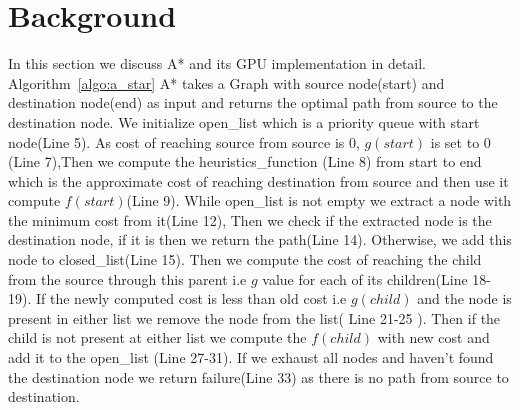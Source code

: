 \documentclass[a4paper]{article}
\begin{document}

\section{Background}\label{sec:background}
In this section we discuss A* and its GPU implementation in detail.
Algorithm~\ref{algo:a_star} A* takes a Graph with source node(start) and destination node(end) as input and returns the optimal path from source to the destination node. We initialize open\_list which is a priority queue with start node(Line 5). As cost of reaching source from source is 0, $g(start)$ is set to 0 (Line 7),Then we compute the heuristics\_function (Line 8) from start to end which is the approximate cost of reaching destination from source and then use it compute $f(start)$(Line 9). While open\_list is not empty we extract a node with the minimum cost from it(Line 12), Then we check if the extracted node is the destination node, if it is then we return the path(Line 14). Otherwise, we add this node to closed\_list(Line 15). Then we compute the cost of reaching the child from the source through this parent i.e $g$ value for each of its children(Line 18-19). If the newly computed cost is less than old cost i.e $g(child)$ and the node is present in either list we remove the node from the list( Line 21-25 ). Then if the child is not present at either list we compute the $f(child)$ with new cost and add it to the open\_list (Line 27-31). If we exhaust all nodes and haven't found the destination node we return failure(Line 33) as there is no path from source to destination.

\end{document}

